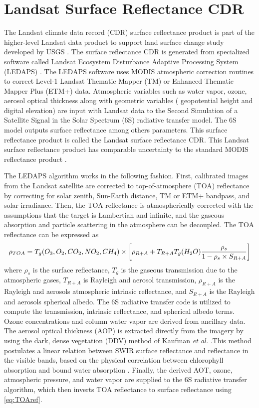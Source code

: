 \section{Landsat Surface Reflectance CDR}
\label{sec:CDR} 
The Landsat climate data record (CDR) surface reflectance product is part of the higher-level Landsat data product to support land surface change study developed by USGS \cite{LandsatCDR}. The surface reflectance CDR is generated from specialized software called Landsat Ecosystem Disturbance Adaptive Processing System (LEDAPS) \cite{Masek:2006}. The LEDAPS software uses MODIS atmospheric correction routines to correct Level-1 Landsat Thematic Mapper (TM) or Enhanced Thematic Mapper Plus (ETM+) data. Atmospheric variables such as water vapor, ozone, aerosol optical thickness along with geometric variables ({ geopotential height} and digital elevation) are input with Landsat data to the Second Simulation of a Satellite Signal in the Solar Spectrum (6S) radiative transfer model. The 6S model outputs surface reflectance among others parameters. This surface reflectance product is called the Landsat surface reflectance CDR. This Landsat surface reflectance product has comparable uncertainty to the standard MODIS reflectance product \cite{Masek:2006}.

The LEDAPS algorithm works in the following fashion. First, calibrated images from the Landsat satellite are corrected to { top-of-atmosphere (TOA) reflectance} by correcting for solar zenith, Sun-Earth distance, TM or ETM+ bandpass, and solar irradiance. Then, the TOA reflectance is atmospherically corrected with the assumptions that the target is Lambertian and infinite, and the gaseous absorption and particle scattering in the atmosphere can be decoupled. The TOA reflectance can be expressed as \cite{Masek:2006}
\begin{equation}
	\rho_{TOA}=T_g(O_3,O_2,CO_2,NO_2,CH_4)\\	
		\times \left[\rho_{R+A}+T_{R+A}T_g(H_2O)\frac{\rho_s}{1-\rho_s\times S_{R+A}}\right]
		\label{eq:TOAref} 
\end{equation}
where $\rho_s$ is the surface reflectance, $T_g$ is the gaseous transmission due to the atmospheric gases, $T_{R+A}$ is Rayleigh and aerosol transmission, $\rho_{R+A}$ is the Rayleigh and aerosols atmospheric intrinsic reflectance, and $S_{R+A}$ is the Rayleigh and aerosols spherical albedo. The 6S radiative transfer code is utilized to compute the transmission, intrinsic reflectance, and spherical albedo terms. Ozone concentrations and column water vapor are derived from ancillary data. The aerosol optical thickness (AOP) is extracted directly from the imagery by using the dark, dense vegetation (DDV) method of Kaufman {\it et al.} .This method postulates a linear relation between SWIR surface reflectance and reflectance in the visible bands, based on the physical correlation between chlorophyll absorption and bound water absorption . Finally, the derived AOT, ozone, atmospheric pressure, and water vapor are supplied to the 6S radiative transfer algorithm, which then inverts TOA reflectance to surface reflectance using \autoref{eq:TOAref}. 

